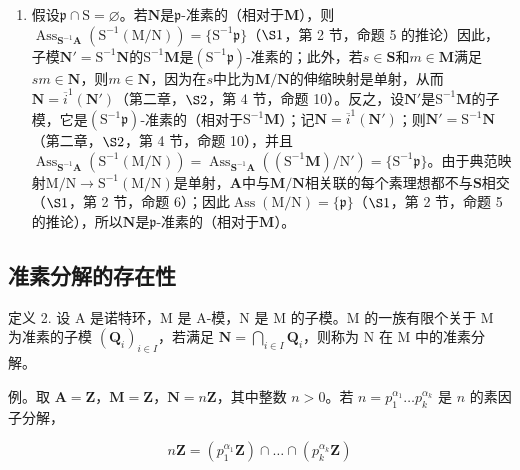 \begin{enumerate}
\def\labelenumi{(\roman{enumi})}
\setcounter{enumi}{1}
\tightlist
\item
   假设\(\mathfrak{p} \cap \mathrm{S} = \varnothing\)。若\(\mathbf{N}\)是\(\mathfrak{p}\)-准素的（相对于\(\mathbf{M}\)），则\(\operatorname{Ass}_{\mathbf{S}^{-1}\mathbf{A}}(\mathrm{S}^{-1}(\mathrm{M/N})) = \{\mathrm{S}^{-1}\mathfrak{p}\}\)（\(\S 1\)，第 2 节，命题 5 的推论）因此，子模\(\mathbf{N}' = \mathrm{S}^{-1}\mathbf{N}\)的\(\mathrm{S}^{-1}\mathbf{M}\)是\((\mathrm{S}^{-1}\mathfrak{p})\)-准素的；此外，若\(s \in \mathbf{S}\)和\(m \in \mathbf{M}\)满足\(sm \in \mathbf{N}\)，则\(m \in \mathbf{N}\)，因为在\(s\)中比为\(\mathbf{M/N}\)的伸缩映射是单射，从而\(\mathbf{N} = \overline{i}^{1}(\mathbf{N}')\)（第二章，\(\S 2\)，第 4 节，命题 10）。反之，设\(\mathbf{N}'\)是\(\mathrm{S}^{-1}\mathbf{M}\)的子模，它是\((\mathrm{S}^{-1}\mathfrak{p})\)-准素的（相对于\(\mathrm{S}^{-1}\mathbf{M}\)）；记\(\mathbf{N} = \overline{i}^{1}(\mathbf{N}')\)；则\(\mathbf{N}' = \mathrm{S}^{-1}\mathbf{N}\)（第二章，\(\S 2\)，第 4 节，命题 10），并且\(\operatorname{Ass}_{\mathbf{S}^{-1}\mathbf{A}}(\mathrm{S}^{-1}(\mathrm{M/N})) = \operatorname{Ass}_{\mathbf{S}^{-1}\mathbf{A}}((\mathrm{S}^{-1}\mathbf{M})/\mathrm{N}') = \{\mathrm{S}^{-1}\mathfrak{p}\}\)。由于典范映射\(\mathrm{M/N} \to \mathrm{S}^{-1}(\mathrm{M/N})\)是单射，\(\mathbf{A}\)中与\(\mathbf{M/N}\)相关联的每个素理想都不与\(\mathbf{S}\)相交（\(\S 1\)，第 2 节，命题 6）；因此\(\operatorname{Ass}(\mathrm{M/N}) = \{\mathfrak{p}\}\)（\(\S 1\)，第 2 节，命题 5 的推论），所以\(\mathbf{N}\)是\(\mathfrak{p}\)-准素的（相对于\(\mathbf{M}\)）。
\end{enumerate}

\subsection{准素分解的存在性}

定义 2. 设 A 是诺特环，M 是 A-模，N 是 M 的子模。M 的一族有限个关于 M 为准素的子模 \((\mathbf{Q}_i)_{i\in I}\)，若满足 \(\mathbf{N} = \bigcap_{i\in I}\mathbf{Q}_i\)，则称为 N 在 M 中的准素分解。

例。取 \(\mathbf{A} = \mathbf{Z}\)，\(\mathbf{M} = \mathbf{Z}\)，\(\mathbf{N} = n\mathbf{Z}\)，其中整数 \(n > 0\)。若 \(n = p_{1}^{\alpha_1} \ldots p_{k}^{\alpha_k}\) 是 \(n\) 的素因子分解，

\[
n \mathbf {Z} = (p _ {1} ^ {\alpha_ {1}} \mathbf {Z}) \cap \dots \cap (p _ {k} ^ {\alpha_ {k}} \mathbf {Z})
\]

